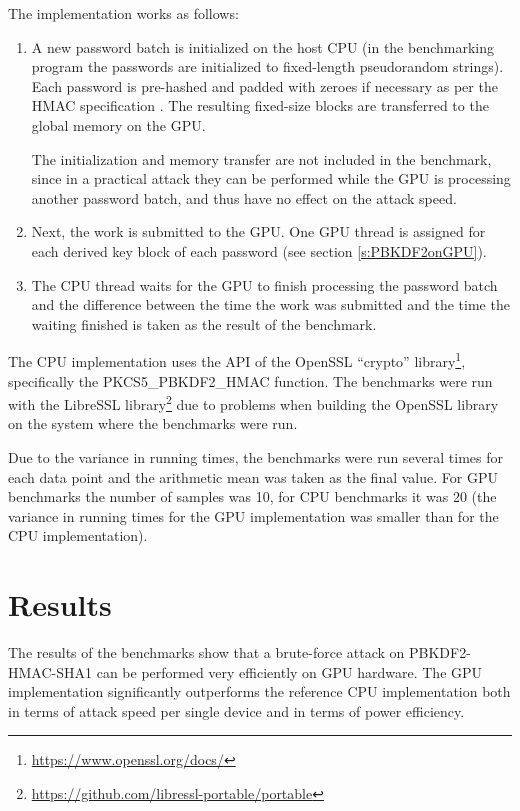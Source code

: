 \documentclass[12pt,oneside]{fithesis2}
\begin{document}
      The implementation works as follows:
      \begin{enumerate}
        \item A new password batch is initialized on the host CPU (in the benchmarking program the passwords are initialized to fixed-length pseudorandom strings). Each password is pre-hashed and padded with zeroes if necessary as per the HMAC specification \cite{rfc2104}. The resulting fixed-size blocks are transferred to the global memory on the GPU.
        
              The initialization and memory transfer are not included in the benchmark, since in a practical attack they can be performed while the GPU is processing another password batch, and thus have no effect on the attack speed.
        \item Next, the work is submitted to the GPU. One GPU thread is assigned for each derived key block of each password (see section \ref{s:PBKDF2onGPU}).
        \item The CPU thread waits for the GPU to finish processing the password batch and the difference between the time the work was submitted and the time the waiting finished is taken as the result of the benchmark.
      \end{enumerate}
      
      The CPU implementation uses the API of the OpenSSL ``crypto'' library\footnote{\url{https://www.openssl.org/docs/}}, specifically the PKCS5\_PBKDF2\_HMAC function. The benchmarks were run with the LibreSSL library\footnote{\url{https://github.com/libressl-portable/portable}} due to problems when building the OpenSSL library on the system where the benchmarks were run.
      
      Due to the variance in running times, the benchmarks were run several times for each data point and the arithmetic mean was taken as the final value. For GPU benchmarks the number of samples was 10, for CPU benchmarks it was 20 (the variance in running times for the GPU implementation was smaller than for the CPU implementation).
      
      \section{Results}
      The results of the benchmarks show that a brute-force attack on PBKDF2-HMAC-SHA1 can be performed very efficiently on GPU hardware. The GPU implementation significantly outperforms the reference CPU implementation both in terms of attack speed per single device and in terms of power efficiency.
      
\end{document}
